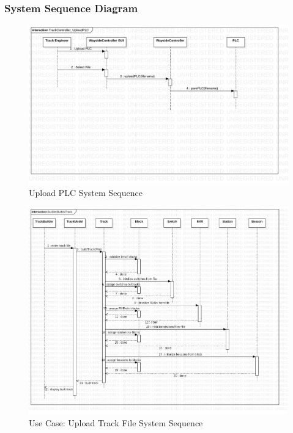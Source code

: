 \documentclass{article}
\begin{document}
    \subsubsection{System Sequence Diagram}
    \begin{figure}[H]
        \centering
        \includegraphics[width=\textwidth]{./SequenceDiagrams/TrackController_UploadPLC.png}
        \caption{Upload PLC System Sequence}
        \label{fig:Upload PLC System Sequence}
    \end{figure}
    \begin{figure}[H]
        \centering
        \includegraphics[width=\textwidth]{./SequenceDiagrams/TrackModel_SeqDiagrams/TrackModel_SeqDiagram_BuilderBuildsTrack.png}
        \caption{Use Case: Upload Track File System Sequence}
        \label{fig:Upload Track File System Sequence}
    \end{figure}
    
\end{document}
